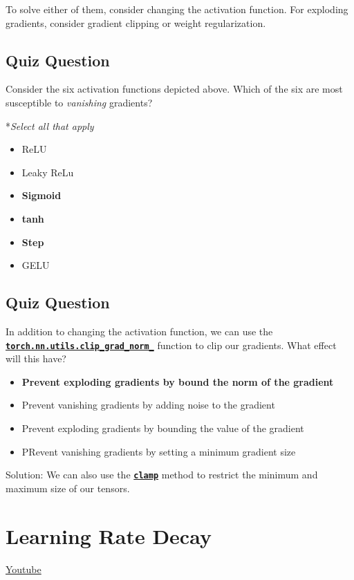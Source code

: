 To solve either of them, consider changing the activation function.  For exploding gradients, consider gradient clipping or weight regularization.

\subsection{Quiz Question}

Consider the six activation functions depicted above. Which of the six are most susceptible to \textit{vanishing} gradients?

*\textit{Select all that apply}

\begin{itemize}
    \item ReLU
    \item Leaky ReLu
    \item \textbf{Sigmoid}
    \item \textbf{tanh}
    \item \textbf{Step}
    \item GELU

\end{itemize}


\subsection{Quiz Question}

In addition to changing the activation function, we can use the \href{https://pytorch.org/docs/stable/generated/torch.nn.utils.clip_grad_norm_.html}{\textbf{\lstinline{torch.nn.utils.clip_grad_norm_}}} function to clip our gradients. What effect will this have?
\begin{itemize}
    \item \textbf{Prevent exploding gradients by bound the norm of the gradient}
    \item Prevent vanishing gradients by adding noise to the gradient
    \item Prevent exploding gradients by bounding the value of the gradient
    \item PRevent vanishing gradients by setting a minimum gradient size
\end{itemize}
Solution: We can also use the \href{https://pytorch.org/docs/stable/generated/torch.clamp.html#torch.clamp}{\textbf{\lstinline{clamp}}} method to restrict the minimum and maximum size of our tensors.

\section{Learning Rate Decay}
\href{https://www.youtube.com/watch?v=TwJ8aSZoh2U&ab_channel=Udacity}{Youtube} \newline

